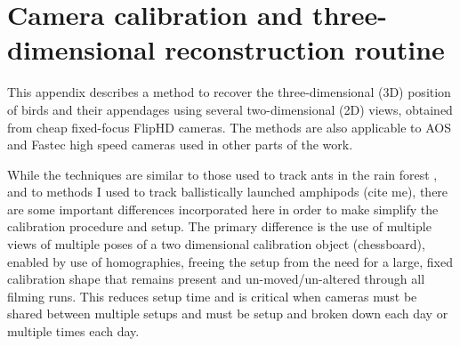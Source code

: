 
\chapter{Camera calibration and three-dimensional reconstruction routine}
\label{app:cam}

This appendix describes a method to recover the three-dimensional (3D) position of birds and their appendages using several two-dimensional (2D) views, obtained from cheap fixed-focus FlipHD cameras.  The methods are also applicable to AOS and Fastec high speed cameras used in other parts of the work.  

While the techniques are similar to those used to track ants in the rain forest \cite{Munk:2011}, and to methods I used to track ballistically launched amphipods (cite me), there are some important differences incorporated here in order to make simplify the calibration procedure and setup. The primary difference is the use of multiple views of multiple poses of a two dimensional calibration object (chessboard), enabled by use of homographies, freeing the setup from the need for a large, fixed calibration shape that remains present and un-moved/un-altered through all filming runs.  This reduces setup time and is critical when cameras must be shared between multiple setups and must be setup and broken down each day or multiple times each day.  



